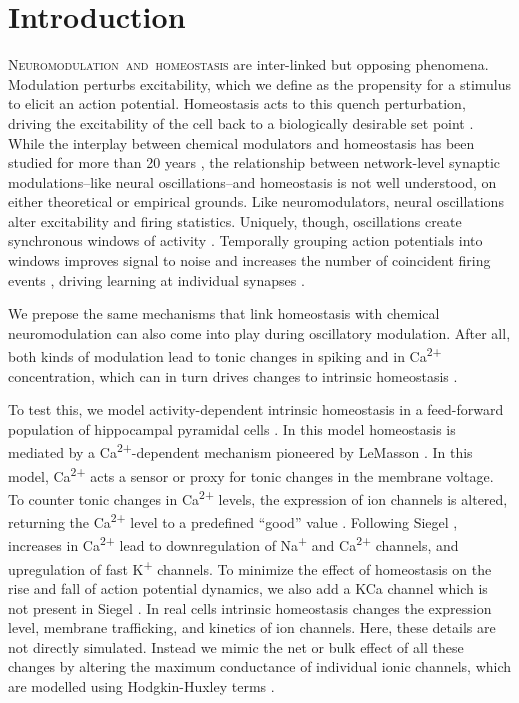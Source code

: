 \documentclass{article}
\begin{document}
\section*{Introduction}
\lettrine[loversize=0,nindent=0,realheight=true]{N}{euromodulation\ and\ homeostasis} are inter-linked but opposing phenomena. Modulation perturbs excitability, which we define as the propensity for a stimulus to elicit an action potential. Homeostasis acts to this quench perturbation, driving the excitability of the cell back to a biologically desirable set point \cite{LeMasson1993,Abbott1993}. While the interplay between chemical modulators and homeostasis has been studied for more than 20 years \cite{LeMasson1993,Abbott1993,Golowasch1999,Marder2014,Marder2015,Gutierrez2013}, the relationship between network-level synaptic modulations--like neural oscillations--and homeostasis is not well understood, on either theoretical or empirical grounds. Like neuromodulators, neural oscillations alter excitability and firing statistics. Uniquely, though, oscillations create synchronous windows of activity \cite{Lisman2013,Voytek2015}. Temporally grouping action potentials into windows improves signal to noise and increases the number of coincident firing events \cite{Chen2013,Zhou2015,Voytek2015a,Peterson2017}, driving learning at individual synapses \cite{Muller2011,Song2000,Markram1997}. 

We prepose the same mechanisms that link homeostasis with chemical neuromodulation can also come into play during oscillatory modulation. After all, both kinds of modulation lead to tonic changes in spiking and in Ca\textsuperscript{2+} concentration, which can in turn drives changes to intrinsic homeostasis \cite{Liu1998}. 

To test this, we model activity-dependent intrinsic homeostasis in a feed-forward population of hippocampal pyramidal cells \cite{Siegel1994}. In this model homeostasis is mediated by a Ca\textsuperscript{2+}-dependent mechanism \cite{Golowasch1999,Marder2014,Marder2015,Gutierrez2013,OLeary2014} pioneered by LeMasson \cite{LeMasson1993,Abbott1993}. In this model, Ca\textsuperscript{2+} acts a sensor or proxy for tonic changes in the membrane voltage. To counter tonic changes in Ca\textsuperscript{2+} levels, the expression of ion channels is altered, returning the Ca\textsuperscript{2+} level to a predefined ``good'' value \cite{Golowasch1999,OLeary2013}. Following Siegel \cite{Siegel1994}, increases in Ca\textsuperscript{2+} lead to downregulation of Na\textsuperscript{+} and Ca\textsuperscript{2+} channels, and upregulation of fast K\textsuperscript{+} channels. To minimize the effect of homeostasis on the rise and fall of action potential dynamics, we also add a KCa channel which is not present in Siegel \citep{Siegel1994}. In real cells intrinsic homeostasis changes the expression level, membrane trafficking, and kinetics of ion channels. Here, these details are not directly simulated. Instead we mimic the net or bulk effect of all these changes by altering the maximum conductance of individual ionic channels, which are modelled using Hodgkin-Huxley terms \cite{LeMasson1993,OLeary2013,OLeary2014}.
\end{document}
